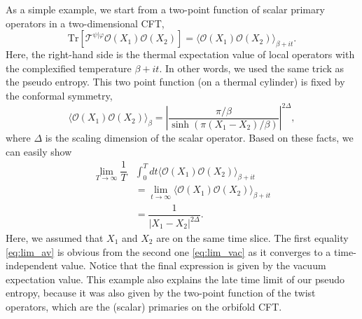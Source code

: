 \documentclass[%
twocolumn, 
secnumarabic,amssymb, preprintnumbers, superscriptaddress, aps, prl]{revtex4-1}
\begin{document}
As a simple example, we start from a two-point function of scalar primary operators in a two-dimensional CFT, 
\begin{equation}
   \mathrm{Tr}\left[\mathcal{T}^{\psi|\varphi}\mathcal{O}(X_1)\mathcal{O}(X_2)\right] = \langle\mathcal{O}(X_1)\mathcal{O}(X_2)\rangle_{\beta+it}.
\end{equation}
Here, the right-hand side is the thermal expectation value of local operators with the complexified temperature $\beta+it$. In other words, we used the same trick as the pseudo entropy. This two point function (on a thermal cylinder) is fixed by the conformal symmetry,
\begin{equation}
\langle\mathcal{O}(X_1)\mathcal{O}(X_2)\rangle_{\beta}=\left|\dfrac{\pi/\beta }{\sinh(\pi (X_1-X_2)/\beta)}\right|^{2\Delta}, \label{eq:2ptwv} 
\end{equation}
where $\Delta$ is the scaling dimension of the scalar operator. Based on these facts, we can easily show
\begin{align}
\lim_{T\rightarrow\infty}\dfrac{1}{T}&\int^T_{0}dt\langle\mathcal{O}(X_1)\mathcal{O}(X_2)\rangle_{\beta+it}\nonumber\\
&=\lim_{t\rightarrow\infty}\langle\mathcal{O}(X_1)\mathcal{O}(X_2)\rangle_{\beta+it}\label{eq:lim_av}\\
&=\dfrac{1}{|X_1-X_2|^{2\Delta}}\label{eq:lim_vac}.
\end{align}
Here, we assumed that $X_1$ and $X_2$ are on the same time slice. The first equality \eqref{eq:lim_av} is obvious from the second one \eqref{eq:lim_vac} as it converges to a time-independent value. Notice that the final expression is given by the vacuum expectation value. This example also explains the late time limit of our pseudo entropy, because it was also given by the two-point function of the twist operators, which are the (scalar) primaries on the orbifold CFT. 

\end{document}
